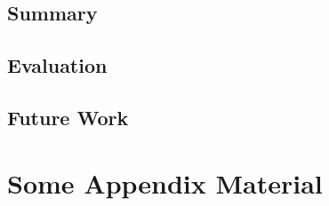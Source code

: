 \documentclass[11pt, a4paper, bibliography=totoc]{report}
\begin{document}
\section{Summary}
\section{Evaluation}
\section{Future Work}





\appendix
\appendixpage
\noappendicestocpagenum
\addappheadtotoc
\chapter{Some Appendix Material}
\end{document}
